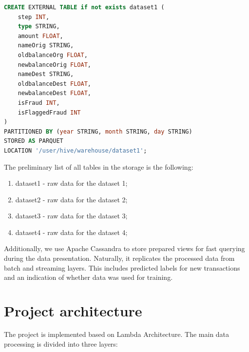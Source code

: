 \documentclass[12pt,a4paper, hidelinks]{article}
\begin{document}
\begin{lstlisting}[language=SQL, caption=Apache Hive table creation]
CREATE EXTERNAL TABLE if not exists dataset1 (
    step INT,
    type STRING,
    amount FLOAT,
    nameOrig STRING,
    oldbalanceOrg FLOAT,
    newbalanceOrig FLOAT,
    nameDest STRING,
    oldbalanceDest FLOAT,
    newbalanceDest FLOAT,
    isFraud INT,
    isFlaggedFraud INT
)
PARTITIONED BY (year STRING, month STRING, day STRING)
STORED AS PARQUET
LOCATION '/user/hive/warehouse/dataset1';
\end{lstlisting}

The preliminary list of all tables in the storage is the following:

\begin{enumerate}
    \item dataset1 - raw data for the dataset 1;
    \item dataset2 - raw data for the dataset 2;
    \item dataset3 - raw data for the dataset 3;
    \item dataset4 - raw data for the dataset 4;
\end{enumerate}

Additionally, we use Apache Cassandra to store prepared views for fast querying during the data presentation. Naturally, it replicates the processed data from batch and streaming layers. This includes predicted labels for new transactions and an indication of whether data was used for training.


\section{Project architecture}

The project is implemented based on Lambda Architecture. The main data processing is divided into three layers:
\end{document}
